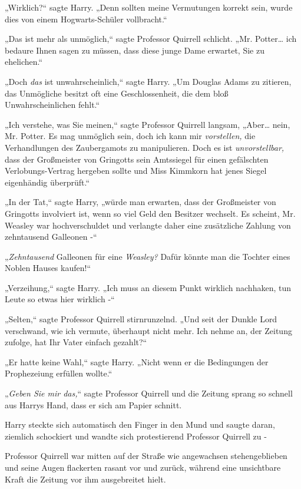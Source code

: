 {„Wirklich?“ sagte Harry. „Denn sollten meine Vermutungen korrekt sein, wurde dies von einem Hogwarts-Schüler vollbracht.“

„Das ist mehr als unmöglich,“ sagte Professor Quirrell schlicht. „Mr. Potter… ich bedaure Ihnen sagen zu müssen, dass diese junge Dame erwartet, Sie zu ehelichen.“

„Doch \emph{das} ist unwahrscheinlich,“ sagte Harry. „Um Douglas Adams zu zitieren, das Unmögliche besitzt oft eine Geschlossenheit, die dem bloß Unwahrscheinlichen fehlt.“

„Ich verstehe, was Sie meinen,“ sagte Professor Quirrell langsam, „Aber… nein, Mr. Potter. Es mag unmöglich sein, doch ich kann mir \emph{vorstellen,} die Verhandlungen des Zaubergamots zu manipulieren. Doch es ist \emph{unvorstellbar,} dass der Großmeister von Gringotts sein Amtssiegel für einen gefälschten Verlobungs-Vertrag hergeben sollte und Miss Kimmkorn hat jenes Siegel eigenhändig überprüft.“

„In der Tat,“ sagte Harry, „würde man erwarten, dass der Großmeister von Gringotts involviert ist, wenn so viel Geld den Besitzer wechselt. Es scheint, Mr. Weasley war hochverschuldet und verlangte daher eine zusätzliche Zahlung von zehntausend Galleonen -“

„\emph{Zehntausend} Galleonen für eine \emph{Weasley?} Dafür könnte man die Tochter eines Noblen Hauses kaufen!“

„Verzeihung,“ sagte Harry. „Ich muss an diesem Punkt wirklich nachhaken, tun Leute so etwas hier wirklich -“

„Selten,“ sagte Professor Quirrell stirnrunzelnd. „Und seit der Dunkle Lord verschwand, wie ich vermute, überhaupt nicht mehr. Ich nehme an, der Zeitung zufolge, hat Ihr Vater einfach gezahlt?“

„Er hatte keine Wahl,“ sagte Harry. „Nicht wenn er die Bedingungen der Prophezeiung erfüllen wollte.“

„\emph{Geben Sie mir das,}“ sagte Professor Quirrell und die Zeitung sprang so schnell aus Harrys Hand, dass er sich am Papier schnitt.

Harry steckte sich automatisch den Finger in den Mund und saugte daran, ziemlich schockiert und wandte sich protestierend Professor Quirrell zu -

Professor Quirrell war mitten auf der Straße wie angewachsen stehengeblieben und seine Augen flackerten rasant vor und zurück, während eine unsichtbare Kraft die Zeitung vor ihm ausgebreitet hielt.

}
